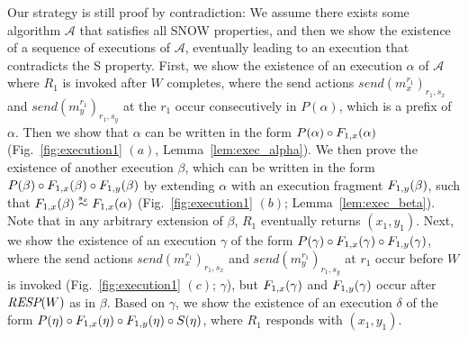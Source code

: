 Our strategy is still proof by contradiction: We assume there exists some algorithm $\mathcal{A}$ that satisfies all SNOW properties, and then we show the existence of a sequence of executions of $\mathcal{A}$, eventually leading to an execution that contradicts  the S property.
 First,  we show the existence of an execution $\alpha$ of $\mathcal{A}$ where 
$R_1$ is invoked after $W$ completes, where the  send actions $send(m_x^{r_1})_{r_1, s_x}$ and $send(m_y^{r_1})_{r_1, s_y}$  at the  $r_1$  occur consecutively 
in  $P(\alpha)$, which is a prefix of $\alpha$. 
 Then we show that $\alpha$  can be written in the form  
${ P(\alpha)} \circ { F_{1,x}(\alpha)}$ (Fig.~\ref{fig:execution1} $(a)$, Lemma~\ref{lem:exec_alpha}). 
 We then prove the existence of  another  execution $\beta$, which can be written in the form ${ P(\beta)} \circ { F_{1,x}(\beta)} \circ { F_{1,y}(\beta)}$ by extending $\alpha$ with an execution fragment ${ F_{1,y}(\beta)}$, such that ${ F_{1,x}(\beta)} \stackrel{s_x}{\sim} { F_{1,x}(\alpha)}$
  (Fig.~\ref{fig:execution1} $(b)$; Lemma~\ref{lem:exec_beta}).
Note that in  any arbitrary extension of $\beta$, $R_1$ eventually returns $(x_1, y_1)$.
Next, we show the existence of an execution $\gamma$ of the form  ${ P(\gamma)} \circ { F_{1,x}(\gamma)} \circ { F_{1,y}(\gamma)}$,  
 where the send actions $send(m_x^{r_1})_{r_1, s_x}$ and $send(m_y^{r_1})_{r_1, s_y}$  at  $r_1$ occur before $W$ is invoked (Fig.~\ref{fig:execution1} $(c)$; $\gamma$), but 
${ F_{1,x}(\gamma)}$  and ${ F_{1,y}(\gamma)}$
occur after ${\textit{RESP}(W)}$ as in $\beta$.
%
%
Based on $\gamma$, we show the existence of an execution $\delta$ 
of the form  ${ P(\eta)} \circ { F_{1,x}(\eta)} \circ { F_{1,y}(\eta)}\circ { S(\eta)}$, where 
  $R_1$ responds with $(x_1, y_1)$.
%
